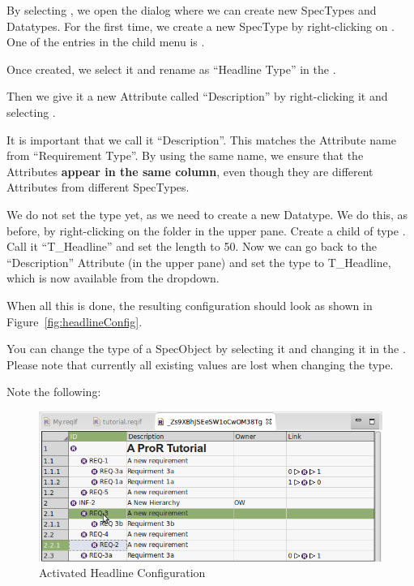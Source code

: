 By selecting , we open the dialog where we can create new SpecTypes and Datatypes.  For the first time, we create a new SpecType by right-clicking on .  One of the entries in the child menu is .

Once created, we select it and rename as ``Headline Type'' in the .

Then we give it a new Attribute called ``Description'' by right-clicking it and selecting .

\begin{warning}
It is important that we call it ``Description''.  This matches the Attribute name from ``Requirement Type''.  By using the same name, we ensure that the Attributes \textbf{appear in the same column}, even though they are different Attributes from different SpecTypes.
\end{warning}

We do not set the type yet, as we need to create a new Datatype.  We do this, as before, by right-clicking on the  folder in the upper pane.  Create a child of type .  Call it ``T\_Headline'' and set the length to 50.  Now we can go back to the ``Description'' Attribute (in the upper pane) and set the type to T\_Headline, which is now available from the dropdown.

When all this is done, the resulting configuration should look as shown in Figure~\ref{fig:headlineConfig}.

You can change the type of a SpecObject by selecting it and changing it in the .  Please note that currently all existing values are lost when changing the type.

Note the following:

\begin{figure}
\centering      
\includegraphics[width=0.8\linewidth]{../rmf-images/hierarchy_step_1}
\caption{Activated Headline Configuration}      
\label{fig:activeHeadlineConfig}
\end{figure}

